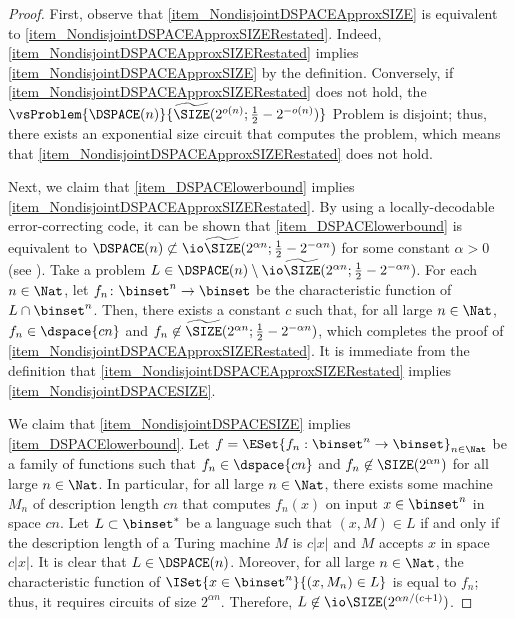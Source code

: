 \documentclass{toc}
\begin{document}
\begin{proof}
  First, observe that \cref{item_NondisjointDSPACEApproxSIZE} is equivalent to \cref{item_NondisjointDSPACEApproxSIZERestated}.
  Indeed, \cref{item_NondisjointDSPACEApproxSIZERestated} implies \cref{item_NondisjointDSPACEApproxSIZE} by the definition.
  Conversely, if \cref{item_NondisjointDSPACEApproxSIZERestated} does not hold,
  the $\vsProblem{\DSPACE(n)}{\widetilde{\SIZE}(2^{o(n)}; \frac{1}{2} - 2^{-o(n)})}$ Problem is disjoint; thus, there exists an exponential size circuit that computes the problem,
  which means that \ref{item_NondisjointDSPACEApproxSIZERestated} does not hold.

  Next, we claim that \cref{item_DSPACElowerbound} implies \cref{item_NondisjointDSPACEApproxSIZERestated}.
  By using a locally-decodable error-correcting code, %
  it can be shown that \cref{item_DSPACElowerbound} is equivalent to $\DSPACE(n) \not\subset \io\widetilde{\SIZE}(2^{\alpha n}; \frac{1}{2} - 2^{- \alpha n})$
  for some constant $\alpha > 0$
  (see  %
  \cite{SudanTV01_jcss_journals, KlivansM02_siamcomp_journals}).
  Take a problem $L \in \DSPACE(n) \setminus \io\widetilde{\SIZE}(2^{\alpha n}; \frac{1}{2} - 2^{- \alpha n})$.
  For each $n \in \Nat$,
  let $f_n \colon \binset^n \to \binset$ be the characteristic function of $L \cap \binset^n$.
  Then,
  there exists a constant $c$ such that, for all large $n \in \Nat$, $f_n \in \dspace{c n}$
  and
  $f_n \not\in \widetilde{\SIZE}(2^{\alpha n}; {\frac{1}{2} - 2^{- \alpha n}})$,
  which completes the proof of \cref{item_NondisjointDSPACEApproxSIZERestated}.
  It is immediate from the definition that \cref{item_NondisjointDSPACEApproxSIZERestated} implies \cref{item_NondisjointDSPACESIZE}.

  We claim that \cref{item_NondisjointDSPACESIZE} implies \cref{item_DSPACElowerbound}.
  Let $f = \ESet{ f_n : \binset^n \to \binset }_{n \in \Nat}$ be a family of functions
  such that
  $f_n \in \dspace{c n}$ and $f_n \not\in \SIZE(2^{\alpha n})$ for all large $n \in \Nat$.
  In particular, for all large $n \in \Nat$, there exists some machine $M_n$ of description length $c n$
  that computes $f_n(x)$ on input $x \in \binset^n$ in space $c n$.
  Let $L \subset \binset^*$ be a language such that $(x, M) \in L$ if and only if
  the description length of a Turing machine $M$ is $c |x|$ and
  $M$ accepts $x$ in space $c |x|$.
  It is clear that $L \in \DSPACE(n)$.
  Moreover, for all large $n \in \Nat$, the characteristic function of $\ISet{ x \in \binset^n }{ (x, M_n) \in L }$
  is equal to $f_n$; thus, it requires circuits of size $2^{\alpha n}$.
  Therefore, $L \not\in \io\SIZE(2^{\alpha n / (c + 1)})$.
\end{proof}
\end{document}
